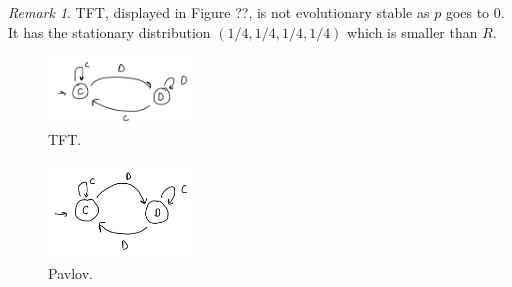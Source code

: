 \documentclass[11pt]{amsart}
\theoremstyle{definition}
\theoremstyle{remark}
\newtheorem*{remark}{Remark}
\begin{document}
\begin{remark}
  TFT, displayed in Figure ??, is not evolutionary stable as $p$ goes to 0. It has the stationary distribution $(1/4,1/4,1/4,1/4)$ which is smaller than $R$.
\end{remark}


\begin{figure}
  \includegraphics[width=4cm]{tft.jpg}
  \centering
  \caption{TFT.}
  \end{figure}
\begin{figure}
  \includegraphics[width=4cm]{pavlov.jpg}
  \centering
  \caption{Pavlov.}
  \end{figure}
\end{document}
